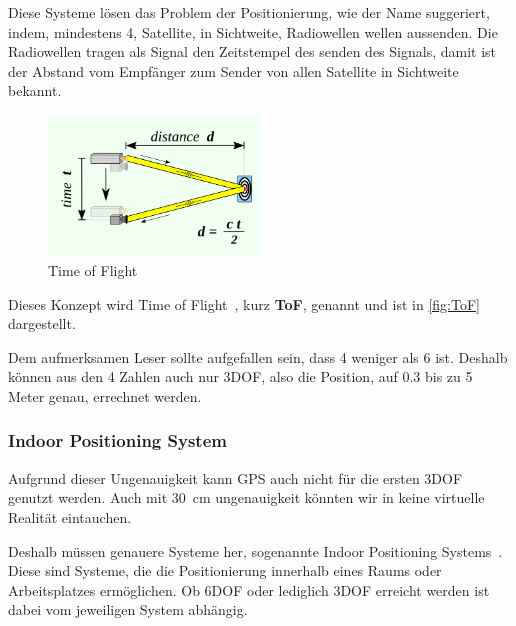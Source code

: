         Diese Systeme lösen das Problem der Positionierung, wie der Name suggeriert, indem, mindestens 4, Satellite, in Sichtweite, Radiowellen wellen aussenden.
        Die Radiowellen tragen als Signal den Zeitstempel des senden des Signals, damit ist der Abstand vom Empfänger zum Sender von allen Satellite in Sichtweite bekannt.
        \begin{figure}[ht!]
            \label{fig:ToF}
            \center
            \includegraphics[width={0.5\textwidth}]{../assets/img/time_of_flight}
            \caption{Time of Flight~\autocite{wikipedia-contributors-2023D}}
        \end{figure}
        Dieses Konzept wird Time of Flight~\autocite{wikipedia-contributors-2023D}, kurz \textbf{ToF}, genannt und ist in \autoref{fig:ToF} dargestellt.

        Dem aufmerksamen Leser sollte aufgefallen sein, dass 4 weniger als 6 ist.
        Deshalb können aus den 4 Zahlen auch nur 3DOF, also die Position, auf 0.3 bis zu 5 Meter genau, errechnet werden.

    \subsubsection{Indoor Positioning System}\label{subsubsec:indoor-positioning-system}
        Aufgrund dieser Ungenauigkeit kann GPS auch nicht für die ersten 3DOF genutzt werden.
        Auch mit 30~cm ungenauigkeit könnten wir in keine virtuelle Realität eintauchen.

        Deshalb müssen genauere Systeme her, sogenannte Indoor Positioning Systems~\autocite{wikipedia-contributors-2023E}.
        Diese sind Systeme, die die Positionierung innerhalb eines Raums oder Arbeitsplatzes ermöglichen.
        Ob 6DOF oder lediglich 3DOF erreicht werden ist dabei vom jeweiligen System abhängig.

